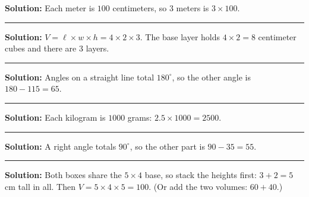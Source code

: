 \documentclass[12pt]{article}
\begin{document}



\textbf{Solution:} Each meter is $100$ centimeters, so $3$ meters is
$3 \times 100$. 

\vspace{0.2cm}\noindent\rule{\linewidth}{0.2pt}\vspace{0.1cm}


\textbf{Solution:} $V = \ell \times w \times h = 4 \times 2 \times 3$. The
base layer holds $4 \times 2 = 8$ centimeter cubes and there are $3$ layers.

\vspace{0.2cm}\noindent\rule{\linewidth}{0.2pt}\vspace{0.1cm}


\textbf{Solution:} Angles on a straight line total $180^\circ$, so the other
angle is $180 - 115 = 65$. 

\vspace{0.2cm}\noindent\rule{\linewidth}{0.2pt}\vspace{0.1cm}


\textbf{Solution:} Each kilogram is $1000$ grams:
$2.5 \times 1000 = 2500$. 

\vspace{0.2cm}\noindent\rule{\linewidth}{0.2pt}\vspace{0.1cm}


\textbf{Solution:} A right angle totals $90^\circ$, so the other part is
$90 - 35 = 55$. 

\vspace{0.2cm}\noindent\rule{\linewidth}{0.2pt}\vspace{0.1cm}


\textbf{Solution:} Both boxes share the $5 \times 4$ base, so stack the
heights first: $3 + 2 = 5$ cm tall in all. Then
$V = 5 \times 4 \times 5 = 100$. (Or add the two volumes: $60 + 40$.)
\end{document}
